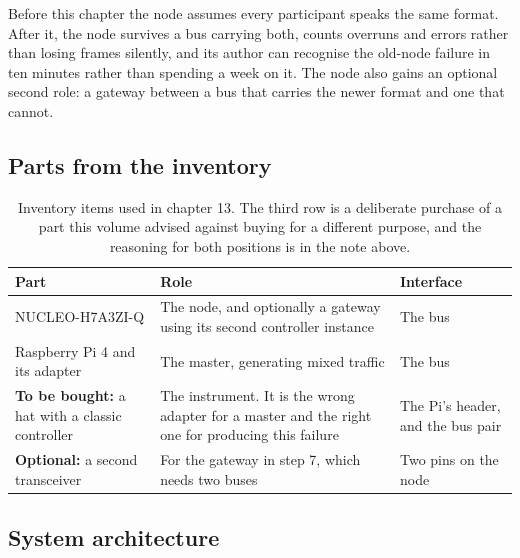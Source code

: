 Before this chapter the node assumes every participant speaks the same format.
After it, the node survives a bus carrying both, counts overruns and errors
rather than losing frames silently, and its author can recognise the old-node
failure in ten minutes rather than spending a week on it. The node also gains an
optional second role: a gateway between a bus that carries the newer format and
one that cannot.

\subsection*{Parts from the inventory}

\begin{table}[H]\centering\small
\begin{tabular}{p{40mm}p{66mm}p{40mm}}
\toprule
Part & Role & Interface \\
\midrule
NUCLEO-H7A3ZI-Q & The node, and optionally a gateway using its second controller instance & The bus \\
Raspberry Pi 4 and its adapter & The master, generating mixed traffic & The bus \\
\textbf{To be bought:} a hat with a classic controller & The instrument. It is the wrong adapter for a master and the right one for producing this failure & The Pi's header, and the bus pair \\
\textbf{Optional:} a second transceiver & For the gateway in step 7, which needs two buses & Two pins on the node \\
\bottomrule
\end{tabular}
\caption{Inventory items used in chapter 13. The third row is a deliberate purchase of a part this volume advised against buying for a different purpose, and the reasoning for both positions is in the note above.}
\end{table}

\subsection*{System architecture}


